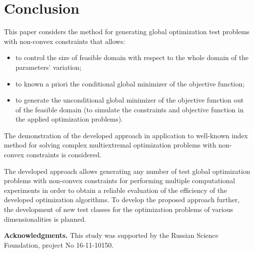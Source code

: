 \documentclass{llncs}
\begin{document}
\section {Conclusion}

This paper considers the method for generating global optimization test problems with non-convex constraints that allows:
\begin{itemize}
	\item to control the size of feasible domain with respect to the whole domain of the parameters' variation;
	\item to known a priori the conditional global minimizer of the objective function;
	\item to generate the unconditional global minimizer of the objective function out of the feasible domain (to simulate the constraints and objective function in the applied optimization problems).
\end{itemize}

The demonstration of the developed approach in application to well-known index method for solving complex multiextremal optimization problems with non-convex constraints is considered.

The developed approach allows generating any number of test global optimization problems with non-convex constraints for performing multiple computational experiments in order to obtain a reliable evaluation of the efficiency of the developed optimization algorithms. To develop the proposed approach further, the development of new test classes for the optimization problems of various dimensionalities is planned.


\bigskip

\textbf{Acknowledgments.} This study was supported by the Russian Science Foundation, project No 16-11-10150.
\end{document}
